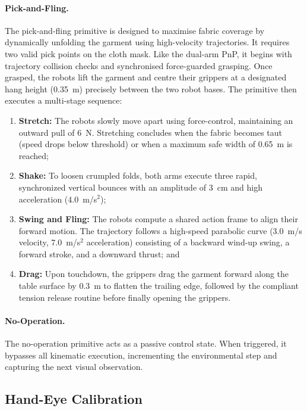 \documentclass[journal]{IEEEtran}
\begin{document}
\paragraph{Pick-and-Fling.} The pick-and-fling primitive is designed to maximise fabric coverage by dynamically unfolding the garment using high-velocity trajectories. It requires two valid pick points on the cloth mask. Like the dual-arm PnP, it begins with trajectory collision checks and synchronised force-guarded grasping. Once grasped, the robots lift the garment and centre their grippers at a designated hang height (0.35~m) precisely between the two robot bases. The primitive then executes a multi-stage sequence: 
\begin{enumerate}
    \item \textbf{Stretch:} The robots slowly move apart using force-control, maintaining an outward pull of 6~N. Stretching concludes when the fabric becomes taut (speed drops below threshold) or when a maximum safe width of 0.65~m is reached;
    \item \textbf{Shake:} To loosen crumpled folds, both arms execute three rapid, synchronized vertical bounces with an amplitude of 3~cm and high acceleration (4.0~m/s$^2$); 
    \item \textbf{Swing and Fling:} The robots compute a shared action frame to align their forward motion. The trajectory follows a high-speed parabolic curve (3.0~m/s velocity, 7.0~m/s$^2$ acceleration) consisting of a backward wind-up swing, a forward stroke, and a downward thrust; and
    \item \textbf{Drag:} Upon touchdown, the grippers drag the garment forward along the table surface by 0.3~m to flatten the trailing edge, followed by the compliant tension release routine before finally opening the grippers.
\end{enumerate}

\paragraph{No-Operation.} The no-operation primitive acts as a passive control state. When triggered, it bypasses all kinematic execution, incrementing the environmental step and capturing the next visual observation. 


\subsection{Hand-Eye Calibration} \label{sec:calibration}
\end{document}
